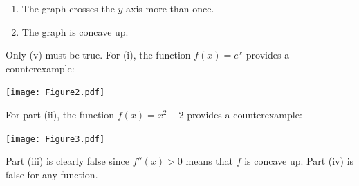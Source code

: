 \documentclass[nooutcomes]{ximera}
\begin{document}
\begin{problem}
\begin{enumerate}
\begin{enumerate}
         \item
           The graph crosses the $y$-axis more than once.

         \item
           The graph is concave up.
       \end{enumerate}
       \begin{freeResponse}
         Only (v) must be true.
         For (i), the function $f(x) = e^x$ provides a counterexample:
         \begin{image}
           \texttt{[image: Figure2.pdf]}
         \end{image}
			
         For part (ii), the function $f(x) = x^2 -2$ provides a counterexample:
         \begin{image}
           \texttt{[image: Figure3.pdf]}
         \end{image}
			
         Part (iii) is clearly false since $f''(x) > 0$ means that $f$ is concave up.
         Part (iv) is false for any function.
       \end{freeResponse}
    \end{enumerate}
\end{problem}
\end{document}
